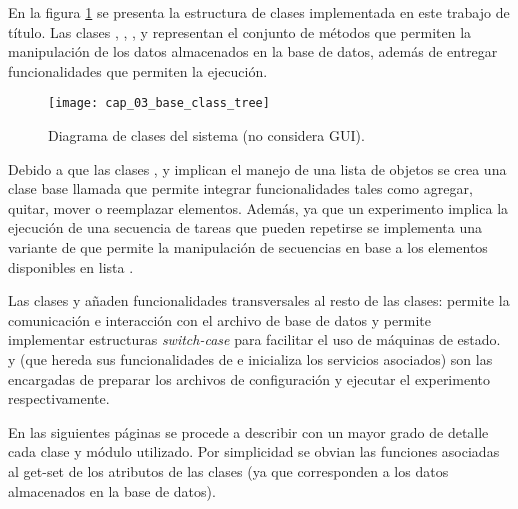 \documentclass[\main/main.tex]{subfiles}
\begin{document}
			En la figura \ref{fig:03_base_class_tree} se presenta la estructura de clases implementada en este trabajo de título. Las clases , , ,  y  representan el conjunto de métodos que permiten la manipulación de los datos almacenados en la base de datos, además de entregar funcionalidades que permiten la ejecución. 
			\begin{figure}[H]
				\centering
				\texttt{[image: cap\_03\_base\_class\_tree]}
				\caption{Diagrama de clases del sistema (no considera GUI).}
				\label{fig:03_base_class_tree}
			\end{figure} 

			Debido a que las clases ,  y  implican el manejo de una lista de objetos se crea una clase base llamada  que permite integrar funcionalidades tales como agregar, quitar, mover o reemplazar elementos. Además, ya que un experimento implica la ejecución de una secuencia de tareas que pueden repetirse se implementa una variante de  que permite la manipulación de secuencias en base a los elementos disponibles en lista .

			Las clases  y  añaden funcionalidades transversales al resto de las clases:  permite la comunicación e interacción con el archivo de base de datos y  permite implementar estructuras \textit{switch-case} para facilitar el uso de máquinas de estado.  y  (que hereda sus funcionalidades de  e inicializa los servicios asociados) son las encargadas de preparar los archivos de configuración y ejecutar el experimento respectivamente.   

			En las siguientes páginas se procede a describir con un mayor grado de detalle cada clase y módulo utilizado. Por simplicidad se obvian las funciones asociadas al get-set de los atributos de las clases (ya que corresponden a los datos almacenados en la base de datos).
			
\end{document}
